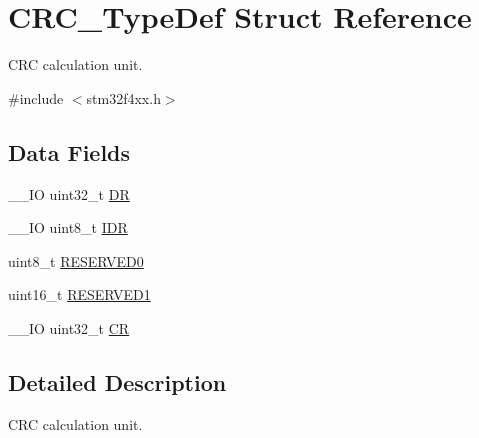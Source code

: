 \hypertarget{struct_c_r_c___type_def}{\section{C\-R\-C\-\_\-\-Type\-Def Struct Reference}
\label{struct_c_r_c___type_def}
}


C\-R\-C calculation unit.  




{\ttfamily \#include $<$stm32f4xx.\-h$>$}

\subsection*{Data Fields}
\begin{DoxyCompactItemize}
\item 
\-\_\-\-\_\-\-I\-O uint32\-\_\-t \hyperlink{struct_c_r_c___type_def_a3df0d8dfcd1ec958659ffe21eb64fa94}{D\-R}
\item 
\-\_\-\-\_\-\-I\-O uint8\-\_\-t \hyperlink{struct_c_r_c___type_def_a601d7b0ba761c987db359b2d7173b7e0}{I\-D\-R}
\item 
uint8\-\_\-t \hyperlink{struct_c_r_c___type_def_aa7d2bd5481ee985778c410a7e5826b71}{R\-E\-S\-E\-R\-V\-E\-D0}
\item 
uint16\-\_\-t \hyperlink{struct_c_r_c___type_def_a8249a3955aace28d92109b391311eb30}{R\-E\-S\-E\-R\-V\-E\-D1}
\item 
\-\_\-\-\_\-\-I\-O uint32\-\_\-t \hyperlink{struct_c_r_c___type_def_ab40c89c59391aaa9d9a8ec011dd0907a}{C\-R}
\end{DoxyCompactItemize}


\subsection{Detailed Description}
C\-R\-C calculation unit. 

